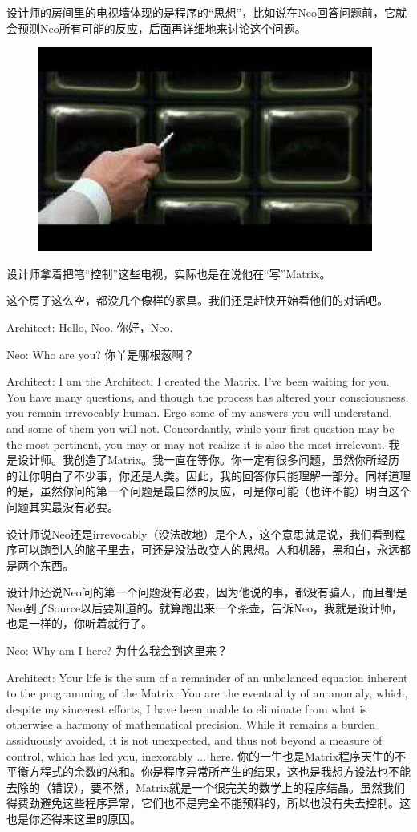 \documentclass[UTF8]{ctexart}
\begin{document}
设计师的房间里的电视墙体现的是程序的“思想”，比如说在Neo回答问题前，它就会预测Neo所有可能的反应，后面再详细地来讨论这个问题。

\begin{figure}[htb]
\centering
\includegraphics[width=0.5\linewidth]{fig/read_reloaded-158}
\end{figure}

设计师拿着把笔“控制”这些电视，实际也是在说他在“写”Matrix。

这个房子这么空，都没几个像样的家具。我们还是赶快开始看他们的对话吧。

Architect: Hello, Neo. 你好，Neo.

Neo: Who are you? 你丫是哪根葱啊？

Architect: I am the Architect. I created the Matrix. I’ve been waiting for you. You have many questions, and though the process has altered your consciousness, you remain irrevocably human. Ergo some of my answers you will understand, and some of them you will not. Concordantly, while your first question may be the most pertinent, you may or may not realize it is also the most irrelevant. 我是设计师。我创造了Matrix。我一直在等你。你一定有很多问题，虽然你所经历的让你明白了不少事，你还是人类。因此，我的回答你只能理解一部分。同样道理的是，虽然你问的第一个问题是最自然的反应，可是你可能（也许不能）明白这个问题其实最没有必要。

设计师说Neo还是irrevocably（没法改地）是个人，这个意思就是说，我们看到程序可以跑到人的脑子里去，可还是没法改变人的思想。人和机器，黑和白，永远都是两个东西。

设计师还说Neo问的第一个问题没有必要，因为他说的事，都没有骗人，而且都是Neo到了Source以后要知道的。就算跑出来一个茶壶，告诉Neo，我就是设计师，也是一样的，你听着就行了。

Neo: Why am I here? 为什么我会到这里来？

Architect: Your life is the sum of a remainder of an unbalanced equation inherent to the programming of the Matrix. You are the eventuality of an anomaly, which, despite my sincerest efforts, I have been unable to eliminate from what is otherwise a harmony of mathematical precision. While it remains a burden assiduously avoided, it is not unexpected, and thus not beyond a measure of control, which has led you, inexorably ... here. 你的一生也是Matrix程序天生的不平衡方程式的余数的总和。你是程序异常所产生的结果，这也是我想方设法也不能去除的（错误），要不然，Matrix就是一个很完美的数学上的程序结晶。虽然我们得费劲避免这些程序异常，它们也不是完全不能预料的，所以也没有失去控制。这也是你还得来这里的原因。
\end{document}
